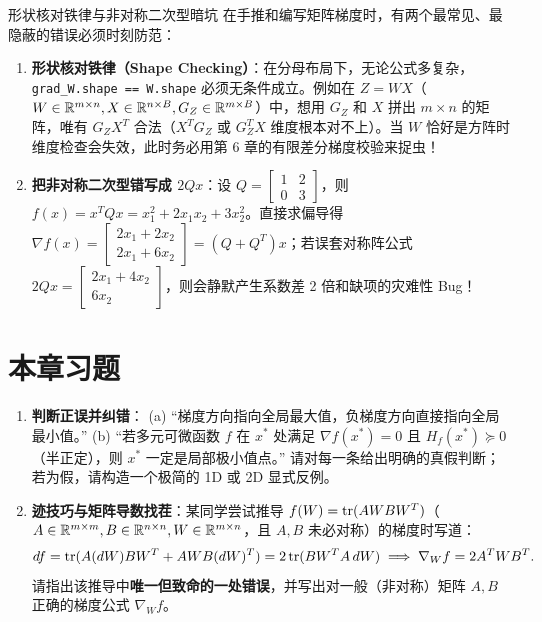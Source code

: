\begin{failBox}{形状核对铁律与非对称二次型暗坑}
在手推和编写矩阵梯度时，有两个最常见、最隐蔽的错误必须时刻防范：
\begin{enumerate}
  \item \textbf{形状核对铁律（Shape Checking）}：在分母布局下，无论公式多复杂，\texttt{grad\_W.shape == W.shape} 必须无条件成立。例如在 $Z = WX$（$W\in\mathbb{R}^{m\times n}, X\in\mathbb{R}^{n\times B}, G_Z\in\mathbb{R}^{m\times B}$）中，想用 $G_Z$ 和 $X$ 拼出 $m\times n$ 的矩阵，唯有 $G_Z X^T$ 合法（$X^T G_Z$ 或 $G_Z^T X$ 维度根本对不上）。当 $W$ 恰好是方阵时维度检查会失效，此时务必用第 6 章的有限差分梯度校验来捉虫！
  \item \textbf{把非对称二次型错写成 $2Qx$}：设 $Q = \begin{bmatrix} 1 & 2 \\ 0 & 3 \end{bmatrix}$，则 $f(x) = x^T Q x = x_1^2 + 2x_1 x_2 + 3x_2^2$。直接求偏导得 $\nabla f(x) = \begin{bmatrix} 2x_1 + 2x_2 \\ 2x_1 + 6x_2 \end{bmatrix} = (Q+Q^T)x$；若误套对称阵公式 $2Qx = \begin{bmatrix} 2x_1 + 4x_2 \\ 6x_2 \end{bmatrix}$，则会静默产生系数差 2 倍和缺项的灾难性 Bug！
\end{enumerate}
\end{failBox}

\section{本章习题}
\label{sec:ch5-exercises}

\begin{enumerate}[label=\textbf{5.\arabic*}]
  \item \textbf{判断正误并纠错}：
  (a) “梯度方向指向全局最大值，负梯度方向直接指向全局最小值。”
  (b) “若多元可微函数 $f$ 在 $x^*$ 处满足 $\nabla f(x^*)=0$ 且 $H_f(x^*) \succeq 0$（半正定），则 $x^*$ 一定是局部极小值点。”
  请对每一条给出明确的真假判断；若为假，请构造一个极简的 1D 或 2D 显式反例。

  \item \textbf{迹技巧与矩阵导数找茬}：某同学尝试推导 $f(W) = \operatorname{tr}(A W B W^T)$（$A\in\mathbb{R}^{m\times m}, B\in\mathbb{R}^{n\times n}, W\in\mathbb{R}^{m\times n}$，且 $A,B$ 未必对称）的梯度时写道：
  \[
    df = \operatorname{tr}(A (dW) B W^T + A W B (dW)^T) = 2\operatorname{tr}(B W^T A\, dW) \implies \nabla_W f = 2 A^T W B^T.
  \]
  请指出该推导中\textbf{唯一但致命的一处错误}，并写出对一般（非对称）矩阵 $A,B$ 正确的梯度公式 $\nabla_W f$。
\end{enumerate}

